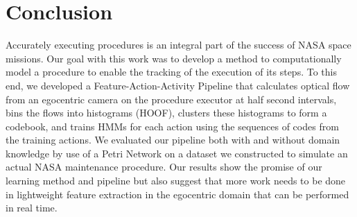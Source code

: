 \documentclass[10pt,twocolumn,letterpaper]{article}
\begin{document}
\section{Conclusion}

Accurately executing procedures is an integral part of the success of NASA space missions. Our goal with this work was to develop a method to computationally model a procedure to enable the tracking of the execution of its steps. To this end, we developed a Feature-Action-Activity Pipeline that calculates optical flow from an egocentric camera on the procedure executor at half second intervals, bins the flows into histograms (HOOF), clusters these histograms to form a codebook, and trains HMMs for each action using the sequences of codes from the training actions. We evaluated our pipeline both with and without domain knowledge by use of a Petri Network on a dataset we constructed to simulate an actual NASA maintenance procedure. Our results show the promise of our learning method and pipeline but also suggest that more work needs to be done in lightweight feature extraction in the egocentric domain that can be performed in real time.


{%


}
\end{document}

